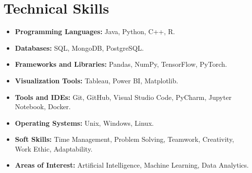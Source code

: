\documentclass[letterpaper,11pt]{article}
\begin{document}
\section*{Technical Skills}
\begin{itemize}
    \setlength{\itemsep}{0pt} %
    \item \textbf{Programming Languages:} Java, Python, C++, R.
    \item \textbf{Databases:} SQL, MongoDB, PostgreSQL.
    \item \textbf{Frameworks and Libraries:} Pandas, NumPy, TensorFlow, PyTorch.
    \item \textbf{Visualization Tools:} Tableau, Power BI, Matplotlib.
    \item \textbf{Tools and IDEs:} Git, GitHub, Visual Studio Code, PyCharm, Jupyter Notebook, Docker.
    \item \textbf{Operating Systems:} Unix, Windows, Linux.
    \item \textbf{Soft Skills:} Time Management, Problem Solving, Teamwork, Creativity, Work Ethic, Adaptability.
    \item \textbf{Areas of Interest:} Artificial Intelligence, Machine Learning, Data Analytics.
\end{itemize}
\end{document}
